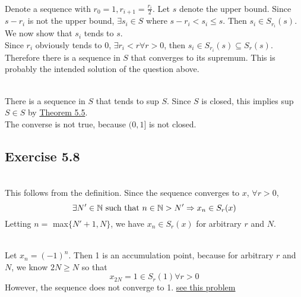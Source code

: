 \begin{solution}
 \\Denote a sequence with $r_0 = 1, r_{i+1} = \frac{r_i}{2}$. Let $s$ denote the upper bound. Since $s - r_i$ is not the upper bound, $\exists s_i \in S$ where $s - r_i < s_i \leq s$. Then $s_i \in S_{r_i}(s)$. We now show that $s_i$ tends to $s$. \\
 Since $r_i$ obviously tends to 0, $\exists r_i < r \forall r > 0$, then $s_i \in S_{r_i}(s) \subseteq S_r(s)$. Therefore there is a sequence in $S$ that converges to its supremum. This is probably the intended solution of the question above.
\end{solution}


\begin{solution}
\\ There is a sequence in $S$ that tends to sup $S$. Since $S$ is closed, this implies sup $S \in S$ by \hyperref[thm3.5.5]{Theorem 5.5}. \\
The converse is not true, because $(0,1]$ is not closed.
\end{solution}

\subsection{Exercise 5.8}


\begin{solution}
 \\This follows from the definition. Since the sequence converges to $x$, $\forall r > 0$,
 $$\exists N' \in \mathbb{N} \text{ such that } n \in \mathbb{N} > N' \Rightarrow x_n \in S_r(x)$$
Letting $n =$ max$\{N'+1,N\}$, we have $x_n \in S_r(x)$ for arbitrary $r$ and $N$.
\end{solution}


\begin{solution}
 \\Let $x_n = (-1)^n$. Then 1 is an accumulation point, because for arbitrary $r$ and $N$, we know $2N \geq N$ so that
 $$x_{2N} = 1 \in S_r(1) \forall r > 0$$
 However, the sequence does not converge to 1. \hyperref[alternatingsign]{see this problem}
\end{solution}

